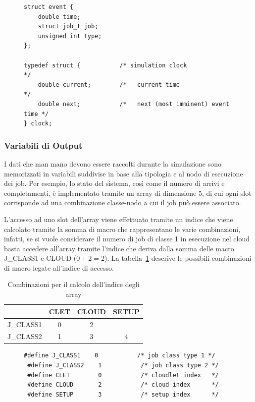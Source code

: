 \begin{figure}[!h]
\begin{lstlisting}[title=Impementazione Evento e Clock Virtuale (basic.h)]
struct event {
    double time;
    struct job_t job;
    unsigned int type;
};

typedef struct {           /* simulation clock                  */
    double current;        /*   current time                    */
    double next;           /*   next (most imminent) event time */
} clock;
\end{lstlisting}
\end{figure}

%
\subsubsection{Variabili di Output}
I dati che man mano devono essere raccolti durante la simulazione sono
memorizzati in variabili suddivise in base alla tipologia e al nodo di
esecuzione dei job. Per esempio, lo stato del sistema, così come il numero di
arrivi e completamenti, è implementato tramite un array di dimensione 5, di cui
ogni slot corrisponde ad una combinazione classe-nodo a cui il job può essere
associato. 

L’accesso ad uno slot dell’array viene effettuato tramite un indice
che viene calcolato tramite la somma di macro che rappresentano le varie
combinazioni, infatti, se si vuole considerare il numero di job di classe 1 in
esecuzione nel cloud basta accedere all’array tramite l’indice che deriva dalla
somma delle macro J\_CLASS1 e CLOUD ($0 + 2 = 2$). La tabella~\ref{comb}
descrive le possibili combinazioni di macro legate all’indice di accesso.
\begin{table}[!h]
\begin{tabular}{c|c|c|c}
          & CLET & CLOUD & SETUP \\
\hline
J\_CLASS1 & 0    & 2     &       \\
\hline
J\_CLASS2 & 1    & 3     & 4     \\
\end{tabular}
\centering
\caption{Combinazioni per il calcolo dell'indice degli array}
\label{comb}
\end{table}
%
\begin{figure}[!h]
\begin{lstlisting}[title=Definizione macro Nodi e Classi (basic.h)]
 #define J_CLASS1    0           /* job class type 1 */
 #define J_CLASS2    1           /* job class type 2 */
 #define CLET        0           /* cloudlet index   */
 #define CLOUD       2           /* cloud index      */
 #define SETUP       3           /* setup index      */
\end{lstlisting}
\end{figure}
